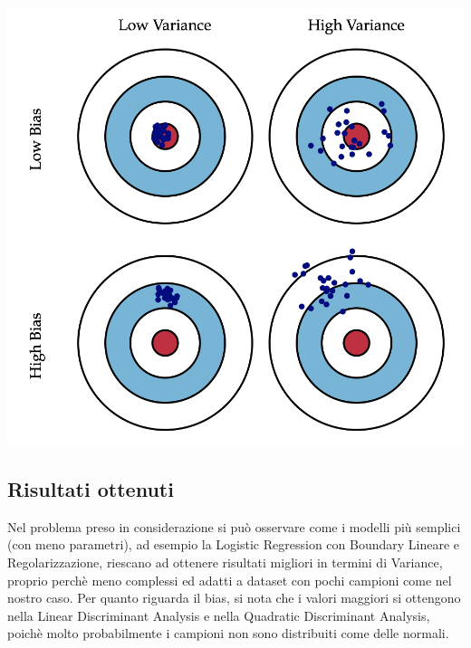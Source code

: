 \documentclass[a4paper,8pt]{article}
\newenvironment{Figure}
  {\par\medskip\noindent\minipage{\linewidth}}
  {\endminipage\par\medskip}
\begin{document}
\begin{multicols}{2}
\begin{Figure}
 \includegraphics[width=\linewidth]{BiasVariance}
\end{Figure}
\subsection{Risultati ottenuti}
Nel problema preso in considerazione si può osservare come i modelli più semplici (con meno parametri), ad esempio la Logistic Regression con Boundary Lineare e Regolarizzazione, riescano ad ottenere risultati migliori in termini di Variance, proprio perchè meno complessi ed adatti a dataset con pochi campioni come nel nostro caso. Per quanto riguarda il bias, si nota che i valori maggiori si ottengono nella Linear Discriminant Analysis e nella Quadratic Discriminant Analysis, poichè molto probabilmente i campioni non sono distribuiti come delle normali.


\end{multicols}
\end{document}
